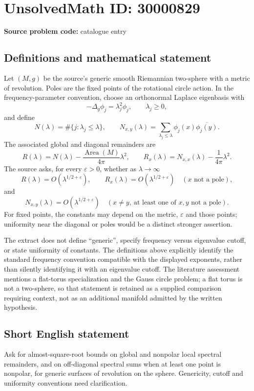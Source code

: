 \documentclass[11pt]{article}
\begin{document}
\section*{UnsolvedMath ID: 30000829}
\textbf{Source problem code:} catalogue entry
\subsection{Definitions and mathematical statement}
Let $(M,g)$ be the source's generic smooth Riemannian two-sphere with a metric of revolution. Poles are the fixed points of the rotational circle action. In the frequency-parameter convention, choose an orthonormal Laplace eigenbasis with
\[
-\Delta_g\phi_j=\lambda_j^2\phi_j,\qquad\lambda_j\geq0,
\]
and define
\[
N(\lambda)=\#\{j:\lambda_j\leq\lambda\},\qquad
N_{x,y}(\lambda)=\sum_{\lambda_j\leq\lambda}\phi_j(x)\overline{\phi_j(y)}.
\]
The associated global and diagonal remainders are
\[
R(\lambda)=N(\lambda)-\frac{\operatorname{Area}(M)}{4\pi}\lambda^2,
\qquad
R_x(\lambda)=N_{x,x}(\lambda)-\frac{1}{4\pi}\lambda^2.
\]
The source asks, for every $\varepsilon>0$, whether as $\lambda\to\infty$
\[
R(\lambda)=O(\lambda^{1/2+\varepsilon}),
\qquad R_x(\lambda)=O(\lambda^{1/2+\varepsilon})
\quad(x\text{ not a pole}),
\]
and
\[
N_{x,y}(\lambda)=O(\lambda^{1/2+\varepsilon})
\quad(x\ne y,\ \text{at least one of }x,y\text{ not a pole}).
\]
For fixed points, the constants may depend on the metric, $\varepsilon$ and those points; uniformity near the diagonal or poles would be a distinct stronger assertion.

The extract does not define ``generic'', specify frequency versus eigenvalue cutoff, or state uniformity of constants. The definitions above explicitly identify the standard frequency convention compatible with the displayed exponents, rather than silently identifying it with an eigenvalue cutoff. The literature assessment mentions a flat-torus specialization and the Gauss circle problem; a flat torus is not a two-sphere, so that statement is retained as a supplied comparison requiring context, not as an additional manifold admitted by the written hypothesis.
\subsection{Short English statement}
Ask for almost-square-root bounds on global and nonpolar local spectral remainders, and on off-diagonal spectral sums when at least one point is nonpolar, for generic surfaces of revolution on the sphere. Genericity, cutoff and uniformity conventions need clarification.
\end{document}
